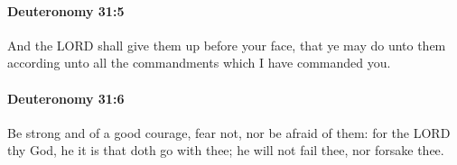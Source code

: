 		\paragraph{Deuteronomy 31:5} %
			\label{DEUTERONOMY-31-5}

			And the LORD shall give them up before your face, that ye may do unto them according unto all the commandments which I have commanded you.


		\paragraph{Deuteronomy 31:6} %
			\label{DEUTERONOMY-31-6}

			Be strong and of a good courage, fear not, nor be afraid of them: for the LORD thy God, he it is that doth go with thee; he will not fail thee, nor forsake thee.


